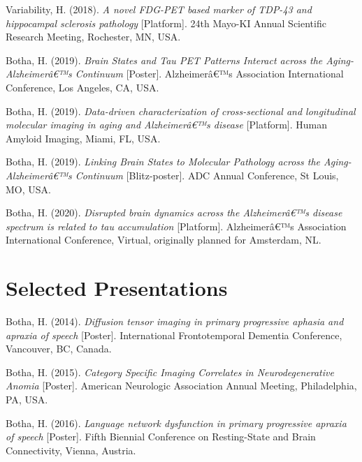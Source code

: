 \documentclass[11pt, a4paper]{awesome-cv}
\begin{document}
\leavevmode\hypertarget{ref-Botha_KI_2018}{}%
Variability, H. (2018). \emph{A novel FDG-PET based marker of TDP-43 and
hippocampal sclerosis pathology} {[}Platform{]}. 24th Mayo-KI Annual
Scientific Research Meeting, Rochester, MN, USA.

\leavevmode\hypertarget{ref-Botha_AIC_2019}{}%
Botha, H. (2019). \emph{Brain States and Tau PET Patterns Interact
across the Aging-Alzheimerâ€™s Continuum} {[}Poster{]}. Alzheimerâ€™s
Association International Conference, Los Angeles, CA, USA.

\leavevmode\hypertarget{ref-Botha_HAI_2019}{}%
Botha, H. (2019). \emph{Data-driven characterization of cross-sectional
and longitudinal molecular imaging in aging and Alzheimerâ€™s disease}
{[}Platform{]}. Human Amyloid Imaging, Miami, FL, USA.

\leavevmode\hypertarget{ref-Botha_ADRD_2019}{}%
Botha, H. (2019). \emph{Linking Brain States to Molecular Pathology
across the Aging-Alzheimerâ€™s Continuum} {[}Blitz-poster{]}. ADC Annual
Conference, St Louis, MO, USA.

\leavevmode\hypertarget{ref-Botha_AAIC_2020}{}%
Botha, H. (2020). \emph{Disrupted brain dynamics across the
Alzheimerâ€™s disease spectrum is related to tau accumulation}
{[}Platform{]}. Alzheimerâ€™s Association International Conference,
Virtual, originally planned for Amsterdam, NL.

\hypertarget{selected-presentations-1}{%
\section{Selected Presentations}\label{selected-presentations-1}}

\begingroup
\setlength{\parindent}{-0in}
\setlength{\leftskip}{0in}
\setlength{\rightskip}{0.1in}
\footnotesize

\hypertarget{refs_presentations}{}
\leavevmode\hypertarget{ref-Botha_FTD_2014}{}%
Botha, H. (2014). \emph{{Diffusion tensor imaging in primary progressive
aphasia and apraxia of speech}} {[}Poster{]}. {International
Frontotemporal Dementia Conference}, Vancouver, {BC}, {Canada}.

\leavevmode\hypertarget{ref-Botha_ANA_2015}{}%
Botha, H. (2015). \emph{{Category Specific Imaging Correlates in
Neurodegenerative Anomia}} {[}Poster{]}. {American Neurologic
Association Annual Meeting}, Philadelphia, {PA}, {USA}.

\leavevmode\hypertarget{ref-Botha_REST_2016}{}%
Botha, H. (2016). \emph{{Language network dysfunction in primary
progressive apraxia of speech}} {[}Poster{]}. {Fifth Biennial Conference
on Resting-State and Brain Connectivity}, Vienna, {Austria}.
\end{document}
